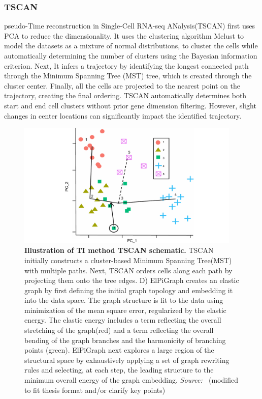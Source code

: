 \subsubsection{TSCAN}
pseudo-Time reconstruction in Single-Cell RNA-seq ANalysis(TSCAN)\citep{ji2016tscan} first uses PCA to reduce the dimensionality. It uses the clustering algorithm Mclust to model the datasets as a mixture of normal distributions, to cluster the cells while automatically determining the number of clusters using the Bayesian information criterion. Next, It infers a trajectory by identifying the longest connected path through the Minimum Spanning Tree (MST) tree, which is created through the cluster center. Finally, all the cells are projected to the nearest point on the trajectory, creating the final ordering. TSCAN automatically determines both start and end cell clusters without prior gene dimension filtering. However, slight changes in center locations can significantly impact the identified trajectory.

\begin{figure}[ht!]
	\centering
	\includegraphics[width=0.95\textwidth]{TI_Alg_TSCAN/fig}
	\vspace{0.1cm}
	\caption[Illustration of TI method TSCAN schematic.]{\textbf{Illustration of TI method TSCAN schematic.}
	TSCAN initially constructs a cluster-based Minimum Spanning Tree(MST) with multiple paths. Next, TSCAN orders cells along each path by projecting them onto the tree edges. 
	D) ElPiGraph creates an elastic graph by first defining the initial graph topology and embedding it into the data space. The graph structure is fit to the data using minimization of the mean square error, regularized by the elastic energy. The elastic energy includes a term reflecting the overall stretching of the graph(red) and a term reflecting the overall bending of the graph branches and the harmonicity of branching points (green). ElPiGraph next explores a large region of the structural space by exhaustively applying a set of graph rewriting rules and selecting, at each step, the leading structure to the minimum overall energy of the graph embedding. \emph{Source: ~\cite{ji2016tscan}}(modified to fit thesis format and/or clarify key points)
	}
	\label{fig:TI_Alg_TSCAN}
\end{figure}

